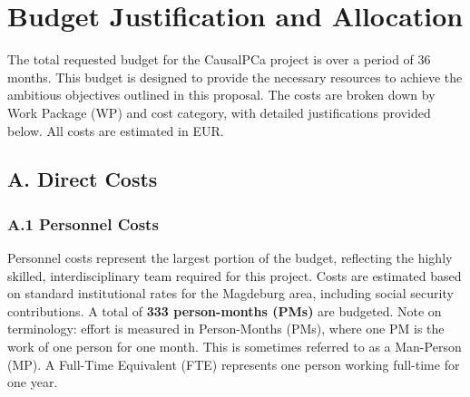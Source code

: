 \section*{Budget Justification and Allocation}

The total requested budget for the CausalPCa project is \textbf{} over a period of 36 months. This budget is designed to provide the necessary resources to achieve the ambitious objectives outlined in this proposal. The costs are broken down by Work Package (WP) and cost category, with detailed justifications provided below. All costs are estimated in EUR.

\subsection*{A. Direct Costs}

\subsubsection*{A.1 Personnel Costs}
Personnel costs represent the largest portion of the budget, reflecting the highly skilled, interdisciplinary team required for this project. Costs are estimated based on standard institutional rates for the Magdeburg area, including social security contributions. A total of \textbf{333 person-months (PMs)} are budgeted. Note on terminology: effort is measured in Person-Months (PMs), where one PM is the work of one person for one month. This is sometimes referred to as a Man-Person (MP). A Full-Time Equivalent (FTE) represents one person working full-time for one year.

